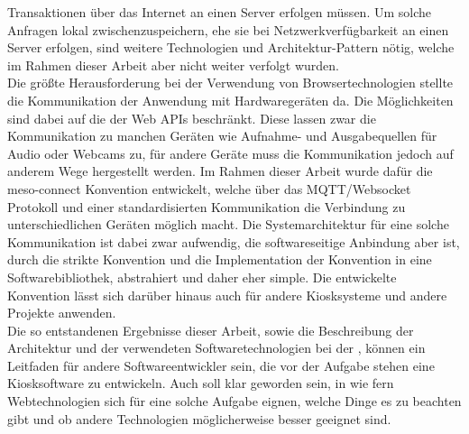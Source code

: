 Transaktionen über das Internet an einen Server erfolgen müssen. Um solche Anfragen lokal zwischenzuspeichern,
ehe sie bei Netzwerkverfügbarkeit an einen Server erfolgen, sind weitere Technologien und 
Architektur-Pattern nötig, welche im Rahmen dieser Arbeit aber nicht weiter verfolgt wurden.\\
Die größte Herausforderung bei der Verwendung von Browsertechnologien stellte die Kommunikation 
der Anwendung mit Hardwaregeräten da. 
Die Möglichkeiten sind dabei auf die der Web APIs beschränkt. Diese lassen zwar die Kommunikation zu manchen
Geräten wie Aufnahme- und Ausgabequellen für Audio oder Webcams zu, für andere Geräte muss die Kommunikation
jedoch auf anderem Wege hergestellt werden. Im Rahmen dieser Arbeit wurde dafür die meso-connect Konvention 
entwickelt, welche über das MQTT/Websocket Protokoll und einer standardisierten Kommunikation die Verbindung
zu unterschiedlichen Geräten möglich macht. Die Systemarchitektur für eine solche Kommunikation ist dabei zwar
aufwendig, die softwareseitige Anbindung aber ist, durch die strikte Konvention und die Implementation der Konvention
in eine Softwarebibliothek, abstrahiert und daher eher simple. Die entwickelte Konvention lässt sich darüber 
hinaus auch für andere Kiosksysteme und andere Projekte anwenden.\\

Die so entstandenen Ergebnisse dieser Arbeit, sowie die Beschreibung der Architektur und der verwendeten
Softwaretechnologien bei der \shst{}, können ein Leitfaden für andere Softwareentwickler sein, die 
vor der Aufgabe stehen eine Kiosksoftware zu entwickeln. Auch soll klar geworden sein, in wie fern 
Webtechnologien sich für eine solche Aufgabe eignen, welche Dinge es zu beachten gibt und ob andere
Technologien möglicherweise besser geeignet sind. 

\iffalse
- Manche Anforderungen an Kiosksoftware, wie die Mulitlingualität, sind mit
Webtechnologien sehr leicht umzusetzen, da sie auch Anforderungen typischer
Webanwendungen darstellen. Technologien dafür sind vorhanden

- Geschlossen

- Vorteile:
  - Deployment ist leicht durch Hosting
  - Kein aufwendiger Build Process, lediglich statische Files
  - Lose Kopplung leicht durch PWA und Server-Client Kommunikation
  - großer Vorteil der Plattforumunabhängigkeit -- gerade bei reinen Browseranwendungen
  universelle Nutzung denkbar

- Nachteile/Probleme:
  - Hardwarekommunikation bedarf spezieller Architektur und Software
  - Geräte können nur in manchen Fällen direkt mit der Applikation kommunizieren;
  - Web APIs werden ständig weiter entwickelt -> Web USB
  - Offline Verfügbarkeit ist bei Browseranwendung und Server/Client Architektur eher 
    aufwendig. 
\fi